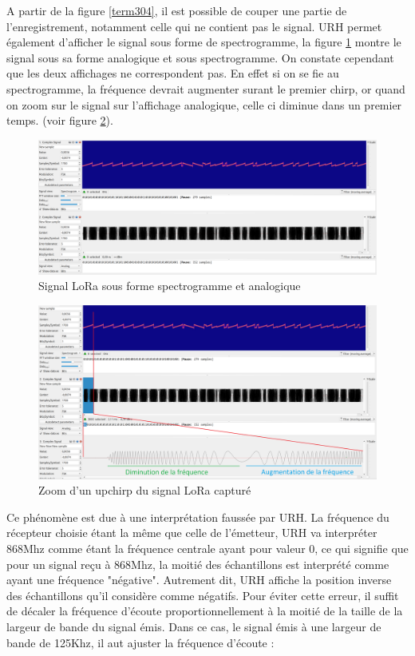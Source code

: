 A partir de la figure \ref{term304}, il est possible de couper une partie de l'enregistrement, notamment celle qui ne contient pas le signal. URH permet également d'afficher le signal sous forme de spectrogramme, la figure \ref{term306} montre le signal sous sa forme analogique et sous spectrogramme. On constate cependant que les deux affichages ne correspondent pas. En effet si on se fie au spectrogramme, la fréquence devrait augmenter surant le premier chirp, or quand on zoom sur le signal sur l'affichage analogique, celle ci diminue dans un premier temps. (voir figure \ref{term307}).

\begin{figure}[h]
\centering

\includegraphics[width=\textwidth]{images/urh4.png}
\caption{Signal LoRa sous forme spectrogramme et analogique}\label{term306}
\end{figure}

\begin{figure}[h]
\centering

\includegraphics[width=\textwidth]{images/urh5.png}
\caption{Zoom d'un upchirp du signal LoRa capturé}\label{term307}
\end{figure}

Ce phénomène est due à une interprétation faussée par URH. La fréquence du récepteur choisie étant la même que celle de l'émetteur, URH va interpréter 868Mhz comme étant la fréquence centrale ayant pour valeur 0, ce qui signifie que pour un signal reçu à 868Mhz, la moitié des échantillons est interprété comme ayant une fréquence "négative". Autrement dit, URH affiche la position inverse des échantillons qu'il considère comme négatifs. Pour éviter cette erreur, il suffit de décaler la fréquence d'écoute proportionnellement à la moitié de la taille de la largeur de bande du signal émis. Dans ce cas, le signal émis à une largeur de bande de 125Khz, il aut ajuster la fréquence d'écoute :


